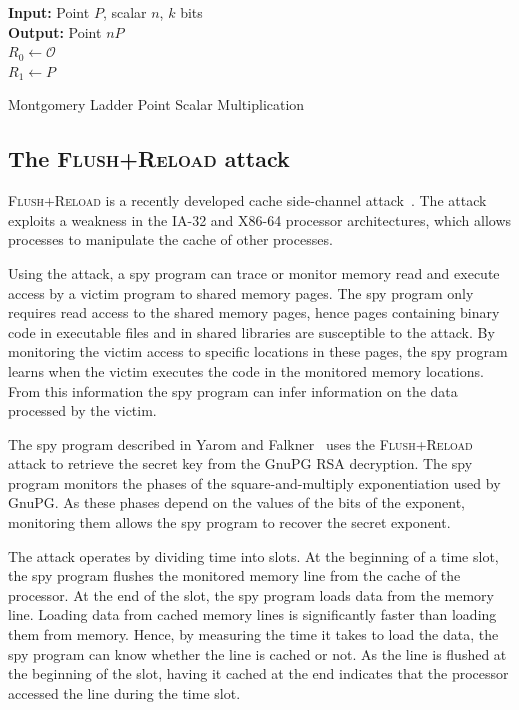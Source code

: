 \documentclass[twocolumn]{svjour3}
\begin{document}
\vspace{-0.5cm}
\begin{algorithm}[htb]\label{mont}
 \SetAlgoLined
{\bf Input:} Point $P$, scalar $n$, $k$ bits\\
{\bf Output:} Point $nP$\\
$R_0\gets \mathcal{O}$\\
$R_1\gets P$\\
 \caption{Montgomery Ladder Point Scalar Multiplication}
\end{algorithm}\vspace{-0.5cm}




\newpage

\subsection{The \textsc{Flush+Reload} attack}
\textsc{Flush+Reload} is a recently developed cache side-channel attack~\cite{yarom13flush}.
The attack exploits a weakness in the IA-32 and X86-64 processor architectures, which allows
processes to manipulate the cache of other processes.

Using the attack, a spy program can trace or monitor memory read and execute access by a victim program to shared memory pages.
The spy program only requires read access to the shared memory pages, hence pages containing binary code in executable files and
in shared libraries are susceptible to the attack.
By monitoring the victim access to specific locations in these pages, the spy program learns when the victim
executes the code in the monitored memory locations.
From this information the spy program can infer information on the data processed by the victim.

The spy program described in Yarom and Falkner~\cite{yarom13flush} uses the \textsc{Flush+Reload} attack to retrieve
the secret key from the GnuPG RSA decryption.
The spy program monitors the phases of the square-and-multiply exponentiation used by GnuPG.  
As these phases depend on the values of the bits of the exponent, monitoring them
allows the spy program to recover the secret exponent.

The attack operates by dividing time into slots.  
At the beginning of a time slot, the spy program flushes the monitored memory line from the cache of the processor.
At the end of the slot, the spy program loads data from the memory line.
Loading data from cached memory lines is significantly faster than loading them from memory.
Hence, by measuring the time it takes to load the data, the spy program can know whether the line is cached or not.
As the line is flushed at the beginning of the slot, having it cached at the end indicates that the processor accessed
the line during the time slot.
\end{document}
